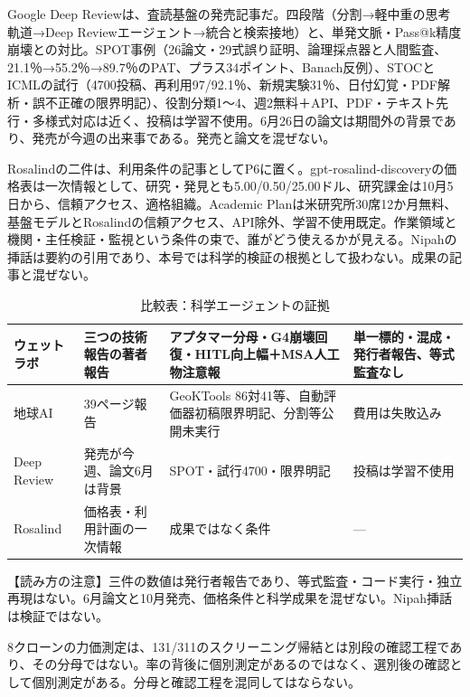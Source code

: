 \documentclass[lualatex,a4paper,10pt]{jlreq}
\begin{document}
Google Deep Reviewは、査読基盤の発売記事だ。四段階（分割→軽中重の思考軌道→Deep Reviewエージェント→統合と検索接地）と、単発文脈・Pass@k精度崩壊との対比。SPOT事例（26論文・29式誤り証明、論理採点器と人間監査、21.1％→55.2％→89.7％のPAT、プラス34ポイント、Banach反例）、STOCとICMLの試行（4700投稿、再利用97/92.1％、新規実験31％、日付幻覚・PDF解析・誤不正確の限界明記）、役割分類1〜4、週2無料＋API、PDF・テキスト先行・多様式対応は近く、投稿は学習不使用。6月26日の論文は期間外の背景であり、発売が今週の出来事である。発売と論文を混ぜない。
\cite{B49,B50}


Rosalindの二件は、利用条件の記事としてP6に置く。gpt-rosalind-discoveryの価格表は一次情報として、研究・発見とも5.00/0.50/25.00ドル、研究課金は10月5日から、信頼アクセス、適格組織。Academic Planは米研究所30席12か月無料、基盤モデルとRosalindの信頼アクセス、API除外、学習不使用既定。作業領域と機関・主任検証・監視という条件の束で、誰がどう使えるかが見える。Nipahの挿話は要約の引用であり、本号では科学的検証の根拠として扱わない。成果の記事と混ぜない。
\cite{B51,B52}


\begin{table}[htbp]\centering\footnotesize
\caption{比較表：科学エージェントの証拠}
\begin{tabularx}{0.96\linewidth}{@{}lXXX@{}}
\toprule
ウェットラボ & 三つの技術報告の著者報告 & アプタマー分母・G4崩壊回復・HITL向上幅＋MSA人工物注意報 & 単一標的・混成・発行者報告、等式監査なし \\
\midrule
地球AI & 39ページ報告 & GeoKTools 86対41等、自動評価器初稿限界明記、分割等公開未実行 & 費用は失敗込み \\
\midrule
Deep Review & 発売が今週、論文6月は背景 & SPOT・試行4700・限界明記 & 投稿は学習不使用 \\
\midrule
Rosalind & 価格表・利用計画の一次情報 & 成果ではなく条件 & --- \\
\bottomrule
\end{tabularx}
\end{table}
\cite{B49,B47,B51,B52,B50,B43,B48,B44,B45,B46}


\begin{tcolorbox}[colback=SurveySoft,colframe=SurveyRule,arc=1mm,boxrule=0.4pt,left=2mm,right=2mm]
【読み方の注意】三件の数値は発行者報告であり、等式監査・コード実行・独立再現はない。6月論文と10月発売、価格条件と科学成果を混ぜない。Nipah挿話は検証ではない。
\end{tcolorbox}
\cite{B49,B47,B51,B52,B50,B43,B48,B44,B45,B46}


8クローンの力価測定は、131/311のスクリーニング帰結とは別段の確認工程であり、その分母ではない。率の背後に個別測定があるのではなく、選別後の確認として個別測定がある。分母と確認工程を混同してはならない。
\cite{B43,B44,B45,B46}
\end{document}
